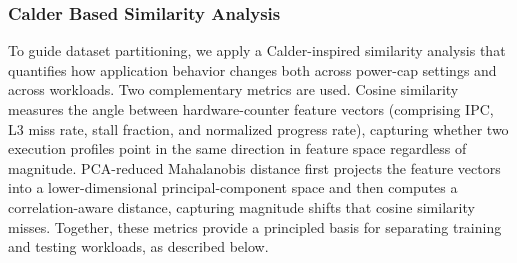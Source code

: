 \subsubsection{Calder Based Similarity Analysis}
\label{sec:calder_similarity}

To guide dataset partitioning, we apply a Calder-inspired similarity analysis that
quantifies how application behavior changes both across power-cap settings and across
workloads.
Two complementary metrics are used.
Cosine similarity measures the angle between hardware-counter feature vectors
(comprising IPC, L3 miss rate, stall fraction, and normalized progress rate),
capturing whether two execution profiles point in the same direction in feature space
regardless of magnitude.
PCA-reduced Mahalanobis distance first projects the feature vectors into a
lower-dimensional principal-component space and then computes a correlation-aware
distance, capturing magnitude shifts that cosine similarity misses.
Together, these metrics provide a principled basis for separating training and
testing workloads, as described below.

